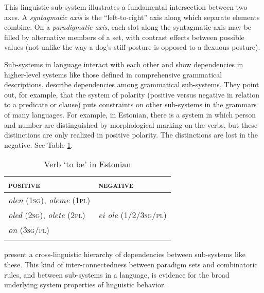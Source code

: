 This linguistic sub-system illustrates a fundamental 
intersection between two axes. A \textit{syntagmatic axis} is the ``left-to-right'' axis along 
which separate elements combine. On a \textit{paradigmatic axis}, each slot along the syntagmatic axis
may be filled by alternative members of a set, with contrast 
effects between possible values (not unlike the way a dog's stiff posture 
is opposed to a flexuous posture). 



Sub-systems in language interact with each other and show dependencies 
in higher-level systems like those defined in comprehensive 
grammatical descriptions. \citet{aikhenvald_dependencies_1998} describe 
dependencies among grammatical sub-systems. They point out, for example, that 
the system of polarity (positive versus negative in relation to a 
predicate or clause) puts constraints on other sub-systems in the grammars of 
many languages. For example, in Estonian, there is a system in which person and number are 
distinguished by morphological marking on the verbs, but these 
distinctions are only realized in positive polarity. The distinctions 
are lost in the negative. See Table \ref{verbtobeinestonian}.





\begin{table}[h]
\centering
\begin{tabular}{ll}
\lsptoprule
\textsc{positive} & \textsc{negative} \\
\midrule
\textit{olen} (\textsc{1sg)}, \textit{oleme} (\textsc{1pl}) 
& \\

\textit{oled} (\textsc{2sg)}, \textit{olete }(\textsc{2pl)} & 
\textit{ei ole} (1/2/3\textsc{sg/pl}) \\

\textit{on} (\textsc{3sg/pl}) & \\
\lspbottomrule
\end{tabular}
\caption{Verb `to be' in Estonian}
\label{verbtobeinestonian}
\end{table}


\citet{aikhenvald_dependencies_1998} present a cross-linguistic hierarchy of dependencies between sub-systems like these. This kind of inter-connectedness between 
paradigm sets and combinatoric rules, and between sub-systems in a 
language, is evidence for the broad underlying system properties of 
linguistic behavior. 



